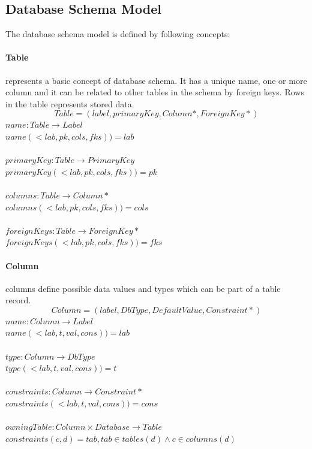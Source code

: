 \documentclass[11pt]{article}
\begin{document}
\subsection{Database Schema Model}
The database schema model is defined by following concepts:
\paragraph{Table} represents a basic concept of database schema. It has a unique name, one or more column and it can be related to other tables in the schema by foreign keys. Rows in the table represents stored data.
$$
Table = (label, primaryKey, Column*, ForeignKey*)
$$
$name : Table \rightarrow Label $ \\
$name(< lab, pk, cols, fks)) = lab$ \\ \\
$primaryKey : Table \rightarrow PrimaryKey $ \\
$primaryKey(< lab, pk, cols, fks)) = pk$ \\ \\
$columns : Table \rightarrow Column* $ \\
$columns(< lab, pk, cols, fks)) = cols$ \\ \\
$foreignKeys : Table \rightarrow ForeignKey* $ \\
$foreignKeys(< lab, pk, cols, fks)) = fks$ 

\paragraph{Column} columns define possible data values and types which can be part of a table record.
$$
Column = (label, DbType, DefaultValue, Constraint*)
$$
$name : Column \rightarrow Label $ \\
$name(< lab, t, val, cons)) = lab $ \\ \\
$type : Column \rightarrow DbType $ \\
$type(< lab, t, val, cons)) = t $ \\ \\
$constraints : Column \rightarrow Constraint* $ \\
$constraints(< lab, t, val, cons)) = cons $ \\ \\
$owningTable : Column \times Database \rightarrow Table $ \\
$constraints(c, d) = tab, tab \in tables(d) \wedge c \in columns(d) $
\end{document}
